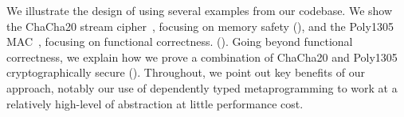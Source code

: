 We illustrate the design of \lowstar using several examples from our
codebase. We show the ChaCha20 stream cipher~\cite{chacha20}, focusing on
memory safety (), and the Poly1305
MAC~\cite{bernstein2005poly1305}, focusing on functional correctness.
().
%
Going beyond functional correctness, we explain how we prove a
combination of ChaCha20 and Poly1305 cryptographically secure
().
%
Throughout, we point out key benefits of our approach, notably our use
of dependently typed metaprogramming to work at a relatively high-level of
abstraction at little performance cost. 







